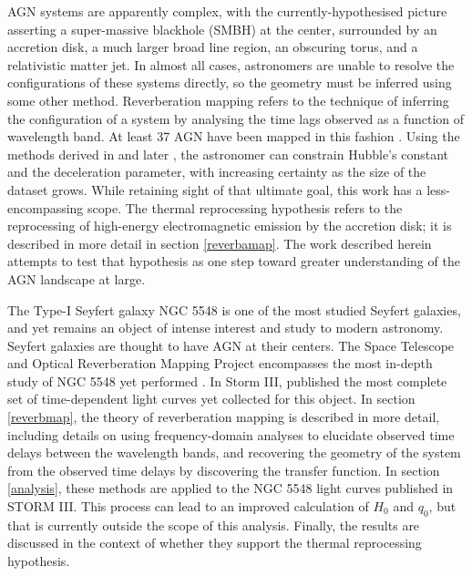 \documentclass[11pt,letterpaper]{article}
\begin{document}
AGN systems are apparently complex, with the currently-hypothesised picture asserting a super-massive blackhole (SMBH) at the center, surrounded by an accretion disk, a much larger broad line region, an obscuring torus, and a relativistic matter jet. In almost all cases, astronomers are unable to resolve the configurations of these systems directly, so the geometry must be inferred using some other method. Reverberation mapping refers to the technique of inferring the configuration of a system by analysing the time lags observed as a function of wavelength band. At least 37 AGN have been mapped in this fashion \citep{2016MNRAS.462..511K} \citep{2006pces.conf...89P}. Using the methods derived in \cite{1999MNRAS.302L..24C} and later \cite{2007MNRAS.380..669C}, the astronomer can constrain Hubble's constant and the deceleration parameter, with increasing certainty as the size of the dataset grows. While retaining sight of that ultimate goal, this work has a less-encompassing scope. The thermal reprocessing hypothesis refers to the reprocessing of high-energy electromagnetic emission by the accretion disk; it is described in more detail in section \ref{reverbamap}. The work described herein attempts to test that hypothesis as one step toward greater understanding of the AGN landscape at large.  

The Type-I Seyfert galaxy NGC 5548 is one of the most studied Seyfert galaxies, and yet remains an object of intense interest and study to modern astronomy. Seyfert galaxies are thought to have AGN at their centers. The Space Telescope and Optical Reverberation Mapping Project encompasses the most in-depth study of NGC 5548 yet performed \citep{2015ApJ...806..128D} \citep{2015ApJ...806..129E} \citep{2016ApJ...821...56F}. In Storm III, \cite{2016ApJ...821...56F} published the most complete set of time-dependent light curves yet collected for this object. In section \ref{reverbmap}, the theory of reverberation mapping is described in more detail, including details on using frequency-domain analyses to elucidate observed time delays between the wavelength bands, and recovering the geometry of the system from the observed time delays by discovering the transfer function. In section \ref{analysis}, these methods are applied to the NGC 5548 light curves published in STORM III. This process can lead to an improved calculation of $H_0$ and $q_0$, but that is currently outside the scope of this analysis. Finally, the results are discussed in the context of whether they support the thermal reprocessing hypothesis.
\end{document}
